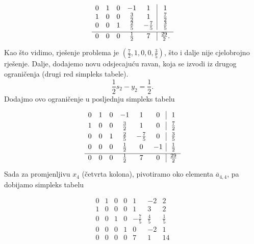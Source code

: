 \documentclass[a4paper, utf8, 11pt, colorlinks]{book}
\theoremstyle{definition}
\begin{document}
$$
\begin{array}{ccccc|c}
    0    &  1  &   0 &   -1  &            1 & 1                  \\
    1    &  0  &  0 &    \frac{3}{2}  &  1 & \frac{7}{2}\\ \vspace{1mm}
    0    &  0  &  1  &   \frac{2}{5}    &  -\frac{7}{5} & \frac{3}{5}  \\ \hline \vspace{1mm}
    0    &  0  &  0   &    \frac{1}{2}  &  7  &    \frac{29}{2}
.\end{array}
$$
Kao što vidimo, rješenje problema je $(\frac{7}{2}, 1, 0, 0, \frac{3}{5})$, što i dalje nije cjelobrojno rješenje. Dalje, dodajemo novu odsjecajuću ravan, koja se izvodi iz drugog ograničenja (drugi red simpleks tabele).
$$ \frac{1}{2} s_2 - y_2 = \frac{1}{2}.$$
Dodajmo ovo ograničenje u posljednju simpleks tabelu

$$
\begin{array}{cccccc|c}\vspace{1mm}
    0    &  1  &   0 &   -1  &            1 & 0 & 1                  \\\vspace{1mm}
    1    &  0  &  0 &    \frac{3}{2}    &  1 & 0 &  \frac{7}{2}\\ \vspace{1mm}
    0    &  0  &  1  &   \frac{2}{5}    &  -\frac{7}{5} &  0 & \frac{3}{5}  \\\vspace{1mm}
    0    & 0   &  0  &   \frac{1}{2}    & 0     & -1 & \frac{1}{2} \\ \hline\vspace{1mm} 
    0    &  0  &  0   &    \frac{1}{2}  &  7  &   0 &  \frac{29}{2}
\end{array}
$$
Sada za promjenljivu $x_4$ (četvrta kolona), pivotiramo oko elementa $\overline{a}_{4,4}$, pa dobijamo simpleks tabelu 

$$
\begin{array}{cccccc|c}
0 &  1   &  0  &  0  &    1             &    -2           &   2         \\
1 &  0   &  0  &  0  &    1             &     3           &   2         \\
0 &  0   &  1  &  0  &   -\frac{7}{5}   &     \frac{4}{5} &   \frac{1}{5}\\
0 &  0   &  0  &  1  &   0              &    -2           &   1   \\ \hline
0 &  0   &  0  &  0  &   7              &     1           &   14
\end{array}
$$
\end{document}
